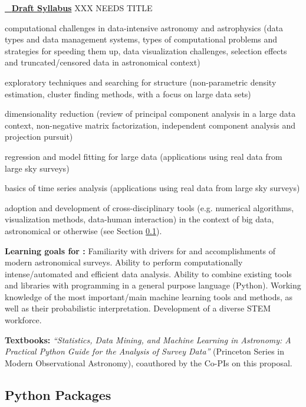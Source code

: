 \vskip 0.2in
\item \underline{\astrocl~ {\bf Draft Syllabus}} XXX NEEDS TITLE \\
\bit
\item computational challenges in data-intensive astronomy and astrophysics 
(data types and data management systems, types of computational problems and 
strategies for speeding them up, data visualization challenges,
selection effects and truncated/censored data in astronomical context)
\item exploratory techniques and searching for structure (non-parametric density estimation,
cluster finding methods, with a focus on large data sets)
\item dimensionality reduction (review of principal component analysis in a large data context,
non-negative matrix factorization, independent component analysis and projection pursuit)
\item regression and model fitting for large data (applications using real data from large sky surveys)
\item basics of time series analysis (applications using real data from large sky surveys)
\item adoption and development of cross-disciplinary tools (e.g. numerical algorithms, visualization 
methods, data-human interaction) in the context of big data, astronomical or otherwise 
(see Section \ref{sec:Python}).
\eit

\item[]{\bf Learning goals for \astrocl:}  Familiarity with drivers for and accomplishments 
of modern astronomical surveys. Ability to perform computationally intense/automated and 
efficient data analysis. Ability to combine existing tools and libraries with programming in a 
general purpose language (Python). Working knowledge of the most important/main machine 
learning tools and methods, as well as their probabilistic interpretation. Development of a 
diverse STEM workforce. 

{\bf Textbooks:} {\it ``Statistics, Data Mining, and Machine Learning in
  Astronomy: A Practical Python Guide for the Analysis of Survey
  Data''} (Princeton Series in Modern Observational Astronomy),  coauthored by the Co-PIs on 
this proposal.

\eit

\subsection{Python Packages} 
\label{sec:Python}


